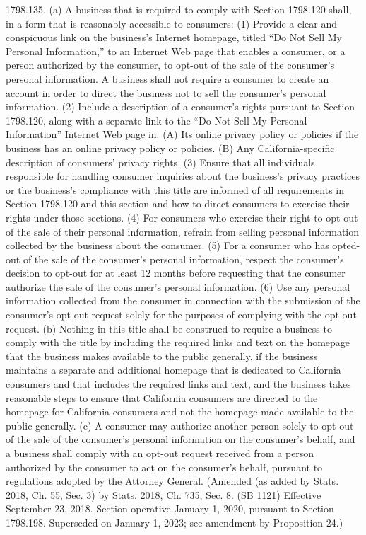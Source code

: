 1798.135.  (a) A business that is required to comply with Section 1798.120 shall, in a form that is reasonably accessible to consumers:
(1) Provide a clear and conspicuous link on the business’s Internet homepage, titled “Do Not Sell My Personal Information,” to an Internet Web page that enables a consumer, or a person authorized by the consumer, to opt-out of the sale of the consumer’s personal information. A business shall not require a consumer to create an account in order to direct the business not to sell the consumer’s personal information.
(2) Include a description of a consumer’s rights pursuant to Section 1798.120, along with a separate link to the “Do Not Sell My Personal Information” Internet Web page in:
(A) Its online privacy policy or policies if the business has an online privacy policy or policies.
(B) Any California-specific description of consumers’ privacy rights.
(3) Ensure that all individuals responsible for handling consumer inquiries about the business’s privacy practices or the business’s compliance with this title are informed of all requirements in Section 1798.120 and this section and how to direct consumers to exercise their rights under those sections.
(4) For consumers who exercise their right to opt-out of the sale of their personal information, refrain from selling personal information collected by the business about the consumer.
(5) For a consumer who has opted-out of the sale of the consumer’s personal information, respect the consumer’s decision to opt-out for at least 12 months before requesting that the consumer authorize the sale of the consumer’s personal information.
(6) Use any personal information collected from the consumer in connection with the submission of the consumer’s opt-out request solely for the purposes of complying with the opt-out request.
(b) Nothing in this title shall be construed to require a business to comply with the title by including the required links and text on the homepage that the business makes available to the public generally, if the business maintains a separate and additional homepage that is dedicated to California consumers and that includes the required links and text, and the business takes reasonable steps to ensure that California consumers are directed to the homepage for California consumers and not the homepage made available to the public generally.
(c) A consumer may authorize another person solely to opt-out of the sale of the consumer’s personal information on the consumer’s behalf, and a business shall comply with an opt-out request received from a person authorized by the consumer to act on the consumer’s behalf, pursuant to regulations adopted by the Attorney General.
(Amended (as added by Stats. 2018, Ch. 55, Sec. 3) by Stats. 2018, Ch. 735, Sec. 8. (SB 1121) Effective September 23, 2018. Section operative January 1, 2020, pursuant to Section 1798.198. Superseded on January 1, 2023; see amendment by Proposition 24.)

